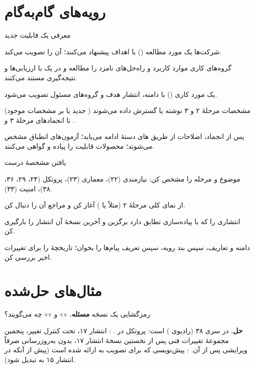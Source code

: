 \documentclass[11pt,a4paper]{article}
\begin{document}
\section{رویه‌های گام‌به‌گام}

\begin{procedurebox}{معرفی یک قابلیت جدید}\label{proc:feature}
\begin{steps}
  \item شرکت‌ها یک مورد مطالعه () با اهداف پیشنهاد می‌کنند؛  آن را تصویب می‌کند.
  \item گروه‌های کاری موارد کاربرد و راه‌حل‌های نامزد را مطالعه و در یک  با ارزیابی‌ها و نتیجه‌گیری مستند می‌کنند.
  \item یک مورد کاری () با دامنه، انتشار هدف و گروه‌های مسئول تصویب می‌شود.
  \item مشخصات مرحلهٔ ۲ و ۳ نوشته یا گسترش داده می‌شوند ( جدید یا  بر مشخصات موجود) تا انجمادهای مرحلهٔ ۳ و
        .
  \item پس از انجماد، اصلاحات از طریق های دستهٔ  ادامه می‌یابد؛ آزمون‌های انطباق مشخص می‌شوند؛ محصولات قابلیت
        را پیاده و گواهی می‌کنند.
\end{steps}
\end{procedurebox}

\begin{procedurebox}{یافتن مشخصهٔ درست}\label{proc:find}
\begin{steps}
  \item موضوع و مرحله را مشخص کن: نیازمندی (۲۲)، معماری (۲۳)، پروتکل (۲۴، ۲۹، ۳۶، ۳۸)، امنیت (۳۳).
  \item از نمای کلی مرحلهٔ ۲ (مثلاً  یا ) آغاز کن و مراجع آن را دنبال کن.
  \item انتشاری را که با پیاده‌سازی تطابق دارد برگزین و آخرین نسخهٔ آن انتشار را بارگیری کن.
  \item دامنه و تعاریف، سپس بند رویه، سپس تعریف پیام‌ها را بخوان؛ تاریخچهٔ  را برای تغییرات اخیر بررسی کن.
\end{steps}
\end{procedurebox}

\section{مثال‌های حل‌شده}

\begin{examplebox}{رمزگشایی یک نسخه}\label{ex:version}
\textbf{مسئله.} «» و «» چه می‌گویند؟

\textbf{حل.}  در سری ۳۸ (رادیوی ) است: پروتکل  در . : انتشار ۱۷، تحت کنترل
تغییر، پنجمین مجموعهٔ تغییرات فنی پس از نخستین نسخهٔ انتشار ۱۷، بدون به‌روزرسانی صرفاً ویرایشی پس از آن. :
پیش‌نویسی که برای تصویب به  ارائه شده است (پیش از آنکه در انتشار ۱۵ به  تبدیل شود).
\end{examplebox}
\end{document}
